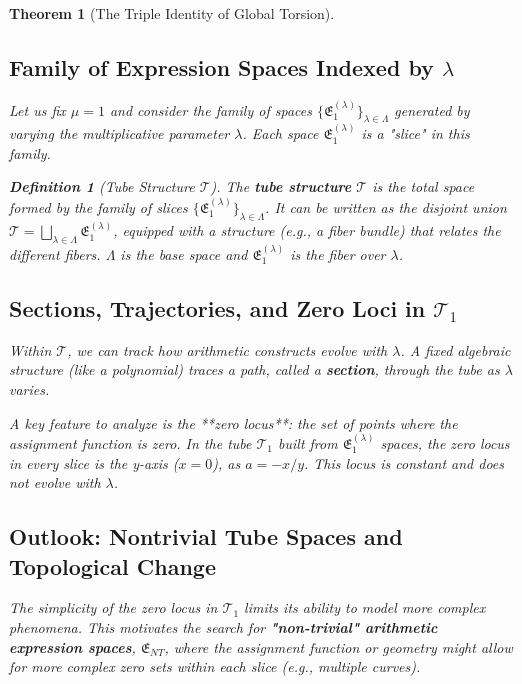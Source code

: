 \documentclass[12pt]{article}
\newtheorem{definition}{Definition}[section]
\newtheorem{theorem}{Theorem}[section]
\begin{document}
\begin{theorem}[The Triple Identity of Global Torsion]
\subsection{Family of Expression Spaces Indexed by \( \lambda \)}

Let us fix \( \mu=1 \) and consider the family of spaces \( \{ \mathfrak{E}_1^{(\lambda)} \}_{\lambda \in \Lambda} \) generated by varying the multiplicative parameter \( \lambda \). Each space \( \mathfrak{E}_1^{(\lambda)} \) is a "slice" in this family.

\begin{definition}[Tube Structure \( \mathcal{T} \)]\label{def:tube_structure_cs}
The \textbf{tube structure} \( \mathcal{T} \) is the total space formed by the family of slices \( \{ \mathfrak{E}_1^{(\lambda)} \}_{\lambda \in \Lambda} \). It can be written as the disjoint union \( \mathcal{T} = \bigsqcup_{\lambda \in \Lambda} \mathfrak{E}_1^{(\lambda)} \), equipped with a structure (e.g., a fiber bundle) that relates the different fibers. \( \Lambda \) is the base space and \( \mathfrak{E}_1^{(\lambda)} \) is the fiber over \( \lambda \).
\end{definition}

\subsection{Sections, Trajectories, and Zero Loci in \( \mathcal{T}_1 \)}

Within \( \mathcal{T} \), we can track how arithmetic constructs evolve with \( \lambda \). A fixed algebraic structure (like a polynomial) traces a path, called a \textbf{section}, through the tube as \( \lambda \) varies.

A key feature to analyze is the **zero locus**: the set of points where the assignment function is zero. In the tube \( \mathcal{T}_1 \) built from \( \mathfrak{E}_1^{(\lambda)} \) spaces, the zero locus in every slice is the y-axis (\( x=0 \)), as \( a = -x/y \). This locus is constant and does not evolve with \( \lambda \).

\subsection{Outlook: Nontrivial Tube Spaces and Topological Change}

The simplicity of the zero locus in \( \mathcal{T}_1 \) limits its ability to model more complex phenomena. This motivates the search for \textbf{"non-trivial" arithmetic expression spaces}, \( \mathfrak{E}_{NT} \), where the assignment function or geometry might allow for more complex zero sets within each slice (e.g., multiple curves).


\end{theorem}
\end{document}
